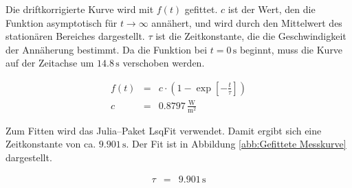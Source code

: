\documentclass[12pt,a4paper]{scrartcl}
\numberwithin{equation}{section} %
\newcommand{\code}[1]{\textsf{#1}}
\begin{document}
Die driftkorrigierte Kurve wird mit $f(t)$ gefittet. $c$ ist der Wert, den die Funktion asymptotisch für $t \rightarrow \infty$ annähert, und wird durch den Mittelwert des stationären Bereiches dargestellt. $\tau $ ist die Zeitkonstante, die die Geschwindigkeit der Annäherung bestimmt. Da die Funktion bei $t=0\mathrm{\,s}$ beginnt, muss die Kurve auf der Zeitachse um $14.8\mathrm{\,s}$ verschoben werden.

\begin{eqnarray}
	f(t) &=& c \cdot \left(
	1 - \exp[-\frac{t}{\tau}]
	\right)
	\label{eq:Drift Fit} \\
	c &=& 0.8797 \mathrm{\,\frac{W}{m^2}}
\end{eqnarray}

\noindent
Zum Fitten wird das \code{Julia}--Paket \code{LsqFit} \cite{Julia:LsqFit} verwendet. Damit ergibt sich eine Zeitkonstante von ca. $9.901 \mathrm{\,s}$. Der Fit ist in Abbildung \ref{abb:Gefittete Messkurve} dargestellt.

\begin{eqnarray}
	\tau &=& 9.901 \mathrm{\,s}
\end{eqnarray}
\end{document}

